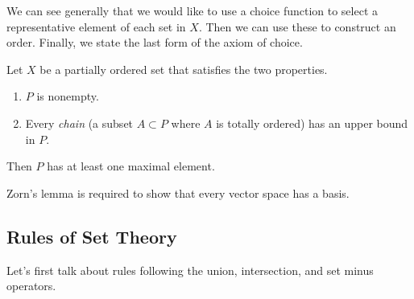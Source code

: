 \documentclass{article}
\begin{document}
    We can see generally that we would like to use a choice function to select a representative element of each set in $X$. Then we can use these to construct an order. Finally, we state the last form of the axiom of choice. 

    \begin{axiom}
      Let $X$ be a partially ordered set that satisfies the two properties. 
      \begin{enumerate}
        \item $P$ is nonempty. 
        \item Every \textit{chain} (a subset $A \subset P$ where $A$ is totally ordered) has an upper bound in $P$. 
      \end{enumerate}
      Then $P$ has at least one maximal element. 
    \end{axiom}

    Zorn's lemma is required to show that every vector space has a basis. 

  \subsection{Rules of Set Theory} 

    Let's first talk about rules following the union, intersection, and set minus operators. 
\end{document}
